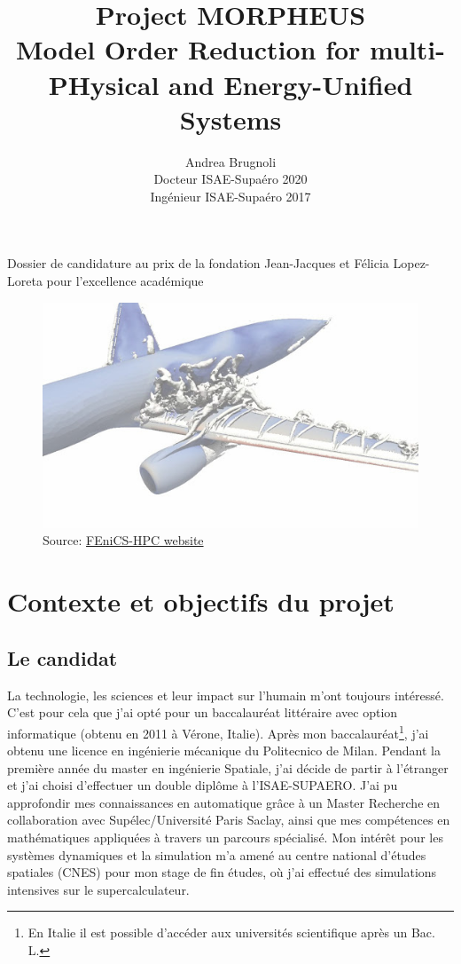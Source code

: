 \documentclass[french]{article}
\author{Andrea Brugnoli \\ 
\hspace{2.8pt} Docteur ISAE-Supaéro 2020\\
Ingénieur ISAE-Supaéro 2017}
\title{Project MORPHEUS \\
\vspace{.3cm}
\Large{Model Order Reduction for multi-PHysical and Energy-Unified Systems}  }
\date{}
\begin{document}
\maketitle

\large{Dossier de candidature au prix de la fondation Jean-Jacques et Félicia
	Lopez-Loreta pour l’excellence académique}


\begin{figure}[h]
	\centering
	\includegraphics[width=.95\textwidth]{3Dplane.jpg}
	\captionsetup{labelformat=empty}
	\caption{Source: \href{http://www.fenics-hpc.org/}{FEniCS-HPC website}}
\end{figure}





\thispagestyle{empty}

\newpage

\section{Contexte et objectifs du projet}

\subsection{Le candidat}


La technologie,  les sciences et leur impact sur l'humain m'ont toujours intéressé. C'est pour cela que j'ai opté pour un baccalauréat littéraire avec option informatique (obtenu en 2011 \`a Vérone, Italie). Après mon baccalauréat\footnote{En Italie il est possible d'accéder aux universités scientifique après un Bac. L.}, j'ai obtenu une licence en ingénierie mécanique du Politecnico de Milan. Pendant la première année du master en ingénierie Spatiale, j'ai décide de partir \`a l'étranger et j'ai choisi d'effectuer un double diplôme \`a l'ISAE-SUPAERO. J'ai pu approfondir mes connaissances en automatique grâce \`a un Master Recherche en collaboration avec Supélec/Université Paris Saclay, ainsi que mes compétences en mathématiques appliquées \`a travers un parcours spécialisé. Mon intérêt pour les systèmes dynamiques et la simulation m'a amené au centre national d'études spatiales (CNES) pour mon stage de fin études, o\`u j'ai effectué des simulations intensives sur le supercalculateur. \\
\end{document}
